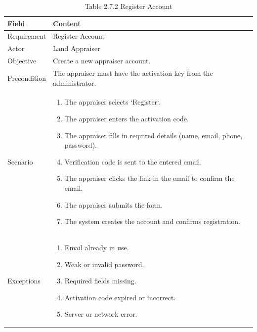 \documentclass[12pt,oneside]{report}
\begin{document}
\begin{table}[H]
\centering
\caption{Table 2.7.2 Register Account}
\label{tab:req-register}
\begin{tabularx}{\textwidth}{|p{3cm}|X|}
\hline
\textbf{Field} & \textbf{Content} \\ \hline

Requirement & Register Account \\ \hline

Actor & Land Appraiser \\ \hline

Objective & Create a new appraiser account. \\ \hline

Precondition & The appraiser must have the activation key from the administrator. \\ \hline

Scenario & 
\begin{minipage}[t]{0.75\textwidth}
\begin{enumerate}[leftmargin=*,label=\arabic*.]
\item The appraiser selects `Register`.
\item The appraiser enters the activation code.
\item The appraiser fills in required details (name, email, phone, password).
\item Verification code is sent to the entered email.
\item The appraiser clicks the link in the email to confirm the email.
\item The appraiser submits the form.
\item The system creates the account and confirms registration.
\end{enumerate}
\end{minipage} \\ \hline

Exceptions & 
\begin{minipage}[t]{0.75\textwidth}
\begin{enumerate}[leftmargin=*,label=\arabic*.]
\item Email already in use.
\item Weak or invalid password.
\item Required fields missing.
\item Activation code expired or incorrect.
\item Server or network error.
\end{enumerate}
\end{minipage} \\ \hline
\end{tabularx}
\end{table}
\end{document}
